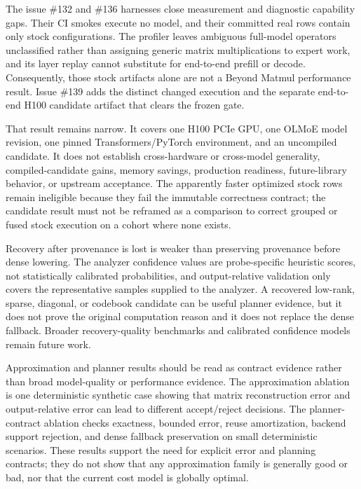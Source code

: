 \documentclass[11pt]{article}
\begin{document}
The issue \#132 and \#136 harnesses close measurement and diagnostic capability
gaps. Their CI smokes execute no model, and their committed real rows contain
only stock configurations. The profiler leaves ambiguous full-model operators
unclassified rather than assigning generic matrix multiplications to expert
work, and its layer replay cannot substitute for end-to-end prefill or decode.
Consequently, those stock artifacts alone are not a Beyond Matmul performance
result. Issue \#139 adds the distinct changed execution and the separate
end-to-end H100 candidate artifact that clears the frozen gate.

That result remains narrow. It covers one H100 PCIe GPU, one OLMoE model
revision, one pinned Transformers/PyTorch environment, and an uncompiled
candidate. It does not establish cross-hardware or cross-model generality,
compiled-candidate gains, memory savings, production readiness, future-library
behavior, or upstream acceptance. The apparently faster optimized stock rows
remain ineligible because they fail the immutable correctness contract; the
candidate result must not be reframed as a comparison to correct grouped or
fused stock execution on a cohort where none exists.

Recovery after provenance is lost is weaker than preserving provenance before
dense lowering. The analyzer confidence values are probe-specific heuristic
scores, not statistically calibrated probabilities, and output-relative
validation only covers the representative samples supplied to the analyzer. A
recovered low-rank, sparse, diagonal, or codebook candidate can be useful
planner evidence, but it does not prove the original computation reason and it
does not replace the dense fallback. Broader recovery-quality benchmarks and
calibrated confidence models remain future work.

Approximation and planner results should be read as contract evidence rather
than broad model-quality or performance evidence. The approximation ablation is
one deterministic synthetic case showing that matrix reconstruction error and
output-relative error can lead to different accept/reject decisions. The
planner-contract ablation checks exactness, bounded error, reuse
amortization, backend support rejection, and dense fallback preservation on
small deterministic scenarios. These results support the need for explicit
error and planning contracts; they do not show that any approximation family is
generally good or bad, nor that the current cost model is globally optimal.
\end{document}
